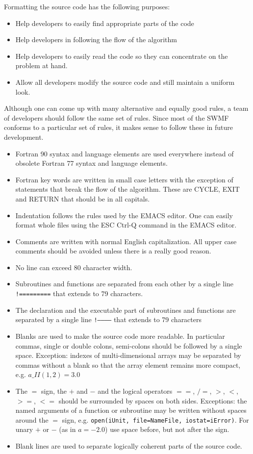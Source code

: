 \documentclass{article}
\begin{document}
Formatting the source code has the following purposes:
\begin{itemize}
\item Help developers to easily find appropriate parts of the code
\item Help developers in following the flow of the algorithm
\item Help developers to easily read the code so they can concentrate
      on the problem at hand.
\item Allow all developers modify the source code and still maintain 
      a uniform look.
\end{itemize}
Although one can come up with many alternative and equally good rules, 
a team of developers should follow the same set of rules. Since most of 
the SWMF conforms to a particular set of rules, it makes sense to follow
these in future development. 

\begin{itemize}
\item Fortran 90 syntax and language elements are used everywhere instead 
      of obsolete Fortran 77 syntax and language elements.
\item Fortran key words are written in small case letters with the 
      exception of statements that break the flow of the algorithm.
      These are CYCLE, EXIT and RETURN that should be in all capitals.
\item Indentation follows the rules used by the EMACS editor. One can
      easily format whole files using the ESC Ctrl-Q command in the
      EMACS editor.
\item Comments are written with normal English capitalization. All upper
      case comments should be avoided unless there is a really good reason.
\item No line can exceed 80 character width. 
\item Subroutines and functions are separated from each other 
      by a single line {\tt !=========} that extends to 79 characters.
\item The declaration and the executable part of subroutines and functions
      are separated by a single line {\tt !------------} that extends to 
      79 characters
\item Blanks are used to make the source code more readable. In particular
      commas, single or double colons, semi-colons should be followed
      by a single space. Exception: indexes of multi-dimensional arrays
      may be separated by commas without a blank so that the array
      element remains more compact, e.g. $a\_II(1,2) = 3.0$
\item The $=$ sign, the $+$ and $-$ and the logical operators
      $==$, $/=$, $>$, $<$, $>=$, $<=$ should be surrounded
      by spaces on both sides. Exceptions: the named arguments of a function
      or subroutine may be written without spaces around the $=$ sign, e.g.
      {\tt open(iUnit, file=NameFile, iostat=iError)}.
      For unary $+$ or $-$ (as in $a = -2.0$) use 
      space before, but not after the sign.
\item Blank lines are used to separate logically coherent parts of the 
      source code.
\end{itemize}
\end{document}
